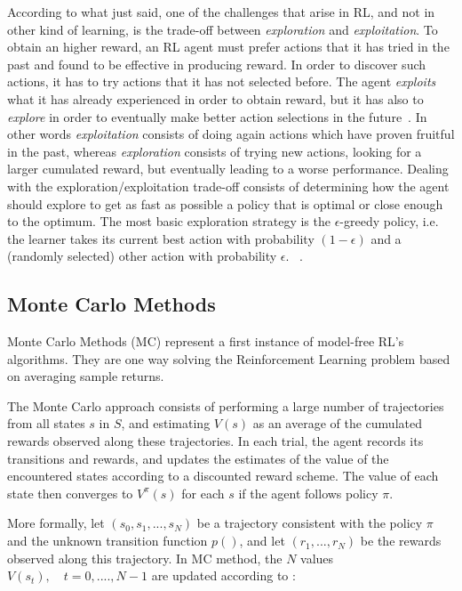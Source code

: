 According to what just said, one of the challenges that arise in RL, and not in other kind of learning, is the trade-off between \textit{exploration} and \textit{exploitation}. To obtain an higher reward, an RL agent must prefer actions that it has tried in the past and found to be effective in producing reward. In order to discover such actions, it has to try actions that it has not selected before. The agent \textit{exploits} what it has already experienced in order to obtain reward, but it has also to \textit{explore} in order to eventually make better action selections in the future~\cite{SuttonBarto}. In other words \textit{exploitation} consists of doing again actions which have proven fruitful in the past, whereas \textit{exploration} consists of trying new actions, looking for a larger cumulated reward, but eventually leading to a worse performance. Dealing with the exploration/exploitation trade-off consists of determining how the agent should explore to get as fast as possible a policy that is optimal or close enough to the optimum. The most basic exploration strategy is the $\epsilon$-greedy policy, i.e. the learner takes its current best action with probability $(1-\epsilon)$ and a (randomly selected) other action with probability $\epsilon$. ~\cite{Sigaud:2010:MDP:1841781}. 

\subsection{Monte Carlo Methods} Monte Carlo Methods (MC)  represent a first instance of model-free RL's algorithms. They are one way solving the Reinforcement Learning problem based on averaging sample returns.

The Monte Carlo approach consists of performing a large number of trajectories from all states $s$ in $S$, and estimating $V(s)$ as an average of the cumulated rewards observed along these trajectories. In each trial, the agent records its transitions and rewards, and updates the estimates of the value of the  encountered states according to a discounted reward scheme. The value of each state then converges to $V^\pi (s)$ for each $s$ if the agent follows policy $\pi$.

More formally, let $(s_0, s_1, ..., s_N)$ be a trajectory consistent with the policy $\pi$ and the unknown transition function $p()$, and let $(r_1, ..., r_N)$ be the rewards observed along this trajectory. In MC method, the $N$ values $V(s_t), \quad t = 0, ...., N-1$ are updated according to :

